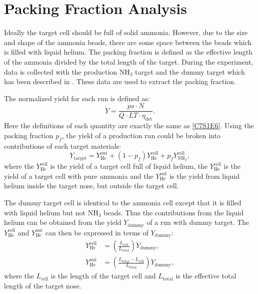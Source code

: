 \section{Packing Fraction Analysis}
\label{C7S3}

Ideally the target cell should be full of solid ammonia. However, due to the size and shape of the ammonia beads, there are some space between the beads which is filled with liquid helium. The packing fraction is defined as the effective length of the ammonia divided by the total length of the target. During the experiment, data is collected with the production NH${}_3$ target and the dummy target which has been described in . These data are used to extract the packing fraction.

The normalized yield for each run is defined as:
\begin{equation} \label{C7S3E1}
Y = \frac{ps\cdot N}{Q\cdot LT\cdot \eta_{\mathrm{det}}}.
\end{equation}
Here the definitions of each quantity are exactly the same as \cref{C7S1E6}. Using the packing fraction $p_f$, the yield of a production run could be broken into contributions of each target materials:
\begin{equation} \label{C7S3E2}
Y_{\mathrm{target}} = Y_{\mathrm{He}}^{\mathrm{out}}+(1-p_f)Y_{\mathrm{He}}^{\mathrm{cell}}+p_fY_{\mathrm{NH_{3}}}^{\mathrm{cell}},
\end{equation}
where the $Y_{\mathrm{He}}^{\mathrm{cell}}$ is the yield of a target cell full of liquid helium, the $Y_{\mathrm{He}}^{\mathrm{cell}}$ is the yield of a target cell with pure ammonia and the $Y_{\mathrm{He}}^{\mathrm{out}}$ is the yield from liquid helium inside the target nose, but outside the target cell.

The dummy target cell is identical to the ammonia cell except that it is filled with liquid helium but not NH${}_3$ beads. Thus the contributions from the liquid helium can be obtained from the yield $Y_{\mathrm{dummy}}$ of a run with dummy target. The $Y_{\mathrm{He}}^{\mathrm{cell}}$ and $Y_{\mathrm{He}}^{\mathrm{out}}$ can then be expressed in terms of $Y_{\mathrm{dummy}}$:
\begin{align} \label{C7S3E3}
Y_{\mathrm{He}}^{\mathrm{cell}} & = \left(\frac{L_{\mathrm{cell}}}{L_{\mathrm{total}}}\right)Y_{\mathrm{dummy}}, \\ \label{C7S3E4}
Y_{\mathrm{He}}^{\mathrm{out}} & = \left(\frac{L_{\mathrm{total}}-L_{\mathrm{cell}}}{L_{\mathrm{total}}}\right)Y_{\mathrm{dummy}},
\end{align}
where the $L_{\mathrm{cell}}$ is the length of the target cell and $L_{\mathrm{total}}$ is the effective total length of the target nose.


